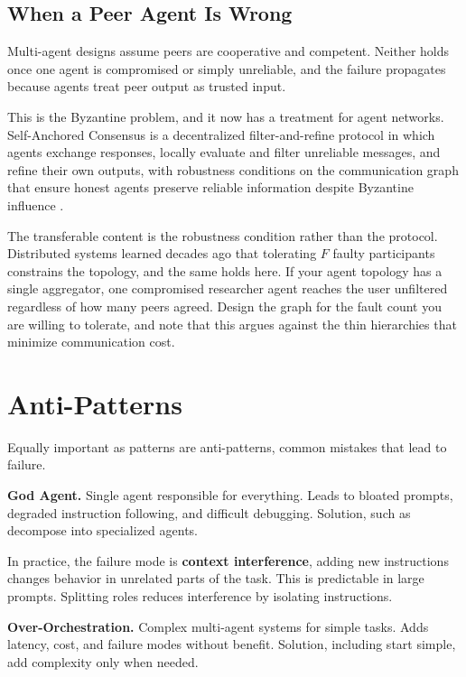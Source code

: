 \subsection{When a Peer Agent Is Wrong}

Multi-agent designs assume peers are cooperative and competent. Neither holds
once one agent is compromised or simply unreliable, and the failure propagates
because agents treat peer output as trusted input.

This is the Byzantine problem, and it now has a treatment for agent networks.
Self-Anchored Consensus is a decentralized filter-and-refine protocol in which
agents exchange responses, locally evaluate and filter unreliable messages, and
refine their own outputs, with robustness conditions on the communication graph
that ensure honest agents preserve reliable information despite Byzantine
influence \cite{byzantine2026}.

The transferable content is the robustness condition rather than the protocol.
Distributed systems learned decades ago that tolerating $F$ faulty participants
constrains the topology, and the same holds here. If your agent topology has a
single aggregator, one compromised researcher agent reaches the user unfiltered
regardless of how many peers agreed. Design the graph for the fault count you
are willing to tolerate, and note that this argues against the thin hierarchies
that minimize communication cost.

\section{Anti-Patterns}

Equally important as patterns are anti-patterns, common mistakes that lead to failure.

\textbf{God Agent.} Single agent responsible for everything. Leads to bloated prompts, degraded instruction following, and difficult debugging. Solution, such as decompose into specialized agents.

In practice, the failure mode is \textbf{context interference}, adding new instructions changes behavior in unrelated parts of the task. This is predictable in large prompts. Splitting roles reduces interference by isolating instructions.

\textbf{Over-Orchestration.} Complex multi-agent systems for simple tasks. Adds latency, cost, and failure modes without benefit. Solution, including start simple, add complexity only when needed.

